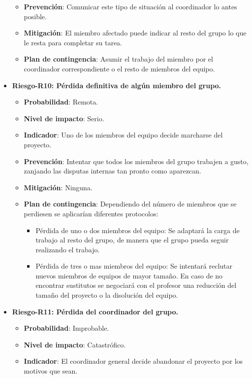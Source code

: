 \begin{itemize}
\begin{itemize}
		\item{ \bf Prevención}: Comunicar este tipo de situación al coordinador lo antes posible.
		\item{ \bf Mitigación}: El miembro afectado puede indicar al resto del grupo lo que le resta para completar su tarea.
		\item{ \bf Plan de contingencia}: Asumir el trabajo del miembro por el coordinador correspondiente	o el resto de miembros del equipo.\\
		\end{itemize}
\item { \bf Riesgo-R10: Pérdida definitiva de algún miembro del grupo.}
		\begin{itemize}	
		\item{ \bf Probabilidad}: Remota.
		\item{ \bf Nivel de impacto}: Serio.
		\item{ \bf Indicador}: Uno de los miembros del equipo decide marcharse del proyecto.
		\item{ \bf Prevención}: Intentar que todos los miembros del grupo trabajen a gusto, zanjando las disputas internas tan pronto como aparezcan.
		\item{ \bf Mitigación}: Ninguna.
		\item{ \bf Plan de contingencia}: Dependiendo del número de miembros que se perdiesen se aplicarían diferentes protocolos:
			\begin{itemize}
			\item Pérdida de uno o dos miembros del equipo: Se adaptará la carga de trabajo al resto del grupo, de manera que el grupo pueda seguir realizando el trabajo.
			\item Pérdida de tres o mas miembros del equipo: Se intentará reclutar nuevos miembros de	equipos de mayor tamaño. En caso de no encontrar sustitutos se negociará con el profesor una reducción del tamaño del proyecto o la disolución del equipo.\\
			\end{itemize}
		\end{itemize}
\item { \bf Riesgo-R11: Pérdida del coordinador del grupo.}
		\begin{itemize}	
		\item{ \bf Probabilidad}: Improbable.
		\item{ \bf Nivel de impacto}: Catastrófico.
		\item{ \bf Indicador}: El coordinador general decide abandonar el proyecto por los motivos que sean.

\end{itemize}
\end{itemize}
